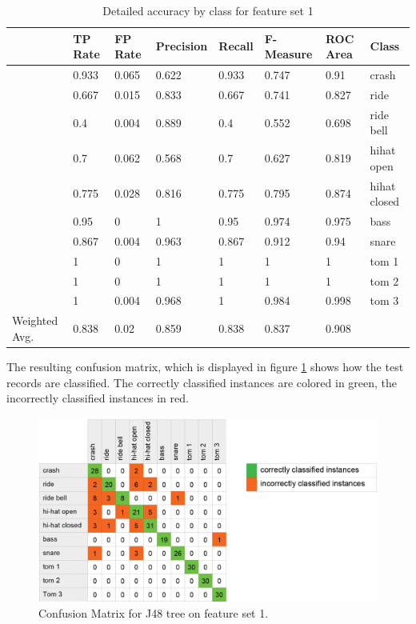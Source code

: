 \begin{table}
  \caption{Detailed accuracy by class for feature set 1}
  \label{tab:wekaAcc1} 
	\centering
	\footnotesize
	\begin{tabular}[c]{|l|l|l|l|l|l|l|l|}
	  \hline
		& TP Rate &  FP Rate &  Precision  & Recall & F-Measure  & ROC Area & Class \\
	  \hline
    & 0.933 & 0.065    &  0.622  &   0.933  &   0.747   &   0.91  &  crash \\
	  \hline
    & 0.667 &   0.015  &    0.833   &  0.667  &   0.741  &    0.827  &  ride \\
	  \hline
    &  0.4 &    0.004  &    0.889  &   0.4    &   0.552  &    0.698  &  ride bell \\
	  \hline
    & 0.7 &   0.062  &    0.568 &    0.7    &   0.627  &    0.819  &  hihat open \\
	  \hline
    & 0.775 &   0.028  &    0.816 &    0.775  &   0.795 &     0.874 &   hihat closed \\
	  \hline
    & 0.95 &    0      &    1    &     0.95   &   0.974 &     0.975 &   bass \\
	  \hline
    &  0.867 &   0.004  &    0.963 &    0.867 &    0.912 &     0.94 &    snare \\
	  \hline
    & 1 &     0     &     1     &    1     &    1     &     1    &    tom 1 \\
	  \hline
    & 1 &      0     &     1     &    1    &     1    &      1    &    tom 2 \\
	  \hline
    & 1 &      0.004   &   0.968  &   1    &     0.984  &    0.998 &   tom 3 \\
	  \hline
Weighted Avg.   & 0.838 &    0.02   &   0.859  &   0.838  &   0.837   &   0.908  & \\
	  \hline
	\end{tabular}
\end{table}

\newpage
The resulting confusion matrix, which is displayed in figure \ref{fig:wekaMatrix1} shows how the test records are classified. The correctly classified instances are colored in green, the incorrectly classified instances in red. 

\begin{figure}[tp]
	\centering
  \includegraphics[width=.65\textwidth]{images/weka/weka_matrix_1.png}
	\caption{Confusion Matrix for J48 tree on feature set 1.}
	\label{fig:wekaMatrix1}
\end{figure}

